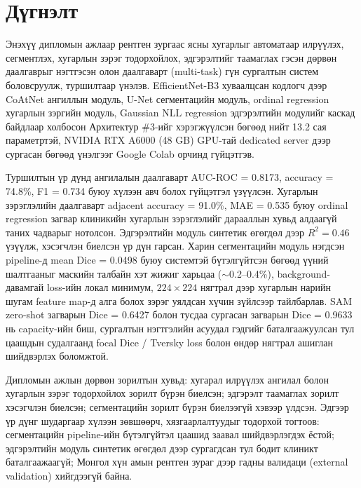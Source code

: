 
{}
\label{Conclusion}
\section*{\centering Дүгнэлт}

Энэхүү дипломын ажлаар рентген зургаас ясны хугарлыг автоматаар илрүүлэх, сегментлэх, хугарлын зэрэг тодорхойлох, эдгэрэлтийг таамаглах гэсэн дөрвөн даалгаврыг нэгтгэсэн олон даалгаварт (multi-task) гүн сургалтын систем боловсруулж, туршилтаар үнэлэв. EfficientNet-B3 хуваалцсан кодлогч дээр CoAtNet ангиллын модуль, U-Net сегментацийн модуль, ordinal regression хугарлын зэргийн модуль, Gaussian NLL regression эдгэрэлтийн модулийг каскад байдлаар холбосон Архитектур \#3-ийг хэрэгжүүлсэн бөгөөд нийт 13.2 сая параметртэй, NVIDIA RTX A6000 (48 GB) GPU-тай dedicated server дээр сургасан бөгөөд үнэлгээг Google Colab орчинд гүйцэтгэв.

Туршилтын үр дүнд ангилалын даалгаварт AUC-ROC = 0.8173, accuracy = 74.8\%, F1 = 0.734 буюу хүлээн авч болох гүйцэтгэл үзүүлсэн. Хугарлын зэрэглэлийн даалгаварт adjacent accuracy = 91.0\%, MAE = 0.535 буюу ordinal regression загвар клиникийн хугарлын зэрэглэлийг дарааллын хувьд алдаагүй таних чадварыг нотолсон. Эдгэрэлтийн модуль синтетик өгөгдөл дээр $R^2 = 0.46$ үзүүлж, хэсэгчлэн биелсэн үр дүн гарсан. Харин сегментацийн модуль нэгдсэн pipeline-д mean Dice = 0.0498 буюу системтэй бүтэлгүйтсэн бөгөөд үүний шалтгааныг маскийн талбайн хэт жижиг харьцаа ($\sim$0.2--0.4\%), background-давамгай loss-ийн локал минимум, $224\times224$ нягтрал дээр хугарлын нарийн шугам feature map-д алга болох зэрэг уялдсан хүчин зүйлсээр тайлбарлав. SAM zero-shot загварын Dice = 0.6427 болон тусдаа сургасан загварын Dice = 0.9633 нь capacity-ийн биш, сургалтын нэгтгэлийн асуудал гэдгийг баталгаажуулсан тул цаашдын судалгаанд focal Dice / Tversky loss болон өндөр нягтрал ашиглан шийдвэрлэх боломжтой.

Дипломын ажлын дөрвөн зорилтын хувьд: хугарал илрүүлэх ангилал болон хугарлын зэрэг тодорхойлох зорилт бүрэн биелсэн; эдгэрэлт таамаглах зорилт хэсэгчлэн биелсэн; сегментацийн зорилт бүрэн биелээгүй хэвээр үлдсэн. Эдгээр үр дүнг шударгаар хүлээн зөвшөөрч, хязгаарлалтуудыг тодорхой тогтоов: сегментацийн pipeline-ийн бүтэлгүйтэл цаашид заавал шийдвэрлэгдэх ёстой; эдгэрэлтийн модуль синтетик өгөгдөл дээр сургагдсан тул бодит клиникт баталгаажаагүй; Монгол хүн амын рентген зураг дээр гадны валидаци (external validation) хийгдээгүй байна.

